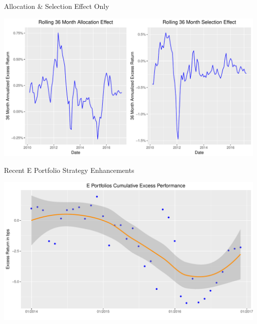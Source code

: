 \documentclass[10pt,english]{beamer}\usepackage[]{graphicx}\usepackage[]{color}
\makeatletter
\def\maxwidth{ %
  \ifdim\Gin@nat@width>\linewidth
    \linewidth
  \else
    \Gin@nat@width
  \fi
}
\newenvironment{knitrout}{}{} %
\makeatother
\begin{document}
\begin{frame}[fragile]{Allocation \& Selection Effect Only}

\begin{knitrout}
\color{fgcolor}
\includegraphics[width=\maxwidth]{figure/eq_rolling-1} 

\end{knitrout}
\end{frame}
%
\begin{frame}[fragile]{Recent E Portfolio Strategy Enhancements }

\begin{knitrout}
\color{fgcolor}
\includegraphics[width=\maxwidth]{figure/e_portfolios-1} 

\end{knitrout}
\end{frame}
%
\end{document}
